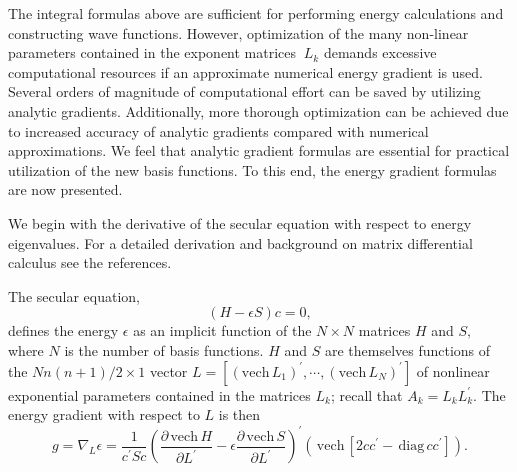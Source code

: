 \documentclass[12pt]{article}
\begin{document}
The integral formulas above are sufficient for performing energy calculations
and constructing wave functions. However, optimization of the many non-linear
parameters contained in the exponent matrices $\ L_{k}$ demands excessive
computational resources if an approximate numerical energy gradient is used.
Several orders of magnitude of computational effort can be saved by utilizing
analytic gradients. Additionally, more thorough optimization can be achieved
due to increased accuracy of analytic gradients compared with numerical
approximations. We feel that analytic gradient formulas are essential for
practical utilization of the new basis functions. To this end, the energy
gradient formulas are now presented.

We begin with the derivative of the secular equation with respect to energy
eigenvalues. For a detailed derivation and background on matrix differential
calculus see the references\cite{Kinghorn95a,Kinghorn95b}.

The secular equation,
\begin{equation}
\left(  H-\epsilon S\right)  c=0,
\end{equation}
defines the energy $\epsilon$ as an implicit function of the $N\times N$
matrices $H$ and $S,$ where $N$ is the number of basis functions. $H$ and $S$
are themselves functions of the $Nn\left(  n+1\right)  /2\times1$ vector
$L=\left[  \left(  \mathrm{vech}\,L_{1}\right)  ^{\prime},\cdots,\left(
\mathrm{vech}\,L_{N}\right)  ^{\prime}\right]  $ of nonlinear exponential
parameters contained in the matrices $L_{k}$; recall that $A_{k}=L_{k}%
L_{k}^{\prime}$. The energy gradient with respect to $L$ is then
\begin{equation}
g=\nabla_{L}\epsilon=\frac{1}{c^{\prime}Sc}\left(  \frac{\partial
\,\mathrm{vech}\,H}{\partial L^{\prime}}-\epsilon\frac{\partial\,\mathrm{vech}%
\,S}{\partial L^{\prime}}\right)  ^{\prime}\left(  \,\mathrm{vech}\,\left[
2cc^{\prime}-\,\mathrm{diag}\,cc^{\prime}\right]  \right)  .\label{grad}%
\end{equation}
\end{document}
